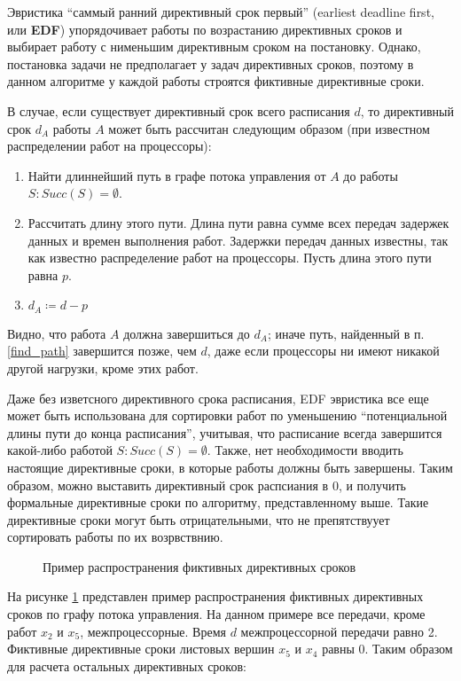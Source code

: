 Эвристика ``саммый ранний директивный срок первый'' (earliest deadline first, или \textbf{EDF}) упорядочивает работы по возрастанию директивных сроков и выбирает работу с нименьшим директивным сроком на постановку. Однако, постановка задачи не предполагает у задач директивных сроков, поэтому в данном алгоритме у каждой работы строятся фиктивные директивные сроки.

В случае, если существует директивный срок всего расписания $d$, то директивный срок $d_A$ работы $A$ может быть рассчитан следующим образом (при известном распределении работ на процессоры):
\begin{enumerate}
    \item \label{find_path} Найти длиннейший путь в графе потока управления от $A$ до работы $S: Succ(S) = \emptyset$.
    \item Рассчитать длину этого пути. Длина пути равна сумме всех передач задержек данных и времен выполнения работ. Задержки передач данных известны, так как известно распределение работ на процессоры. Пусть длина этого пути равна $p$.
    \item $d_A \coloneqq d - p$
\end{enumerate}
Видно, что работа $A$ должна завершиться до $d_A$; иначе путь, найденный в п.\ref{find_path} завершится позже, чем $d$, даже если процессоры ни имеют никакой другой нагрузки, кроме этих работ.

Даже без изветсного директивного срока расписания, EDF эвристика все еще может быть использована для сортировки работ по уменьшению ``потенциальной длины пути  до конца расписания'', учитывая, что расписание всегда завершится какой-либо работой $S : Succ(S) = \emptyset$. Также, нет необходимости вводить настоящие директивные сроки, в которые работы должны быть завершены. Таким образом, можно выставить директивный срок распсиания в $0$, и получить формальные директивные сроки по алгоритму, представленному выше. Такие директивные сроки могут быть отрицательными, что не препятствуует сортировать работы по их возрвствнию.

\begin{figure}[!htbp]
    \caption{Пример распространения фиктивных директивных сроков}
    \label{fig:edf}
\end{figure}

На рисунке \ref{fig:edf} представлен пример распространения фиктивных директивных сроков по графу потока управления. На данном примере все передачи, кроме работ $x_2$ и $x_5$, межпроцессорные. Время $d$ межпроцессорной передачи равно 2. Фиктивные директивные сроки листовых вершин $x_5$ и $x_4$ равны 0. Таким образом для расчета остальных директивных сроков:

